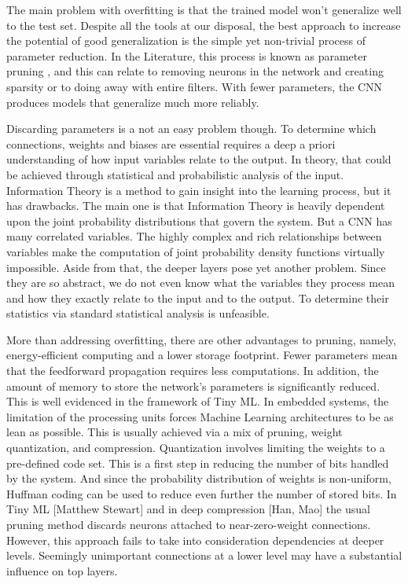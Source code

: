 \documentclass[12pt, a4paper]{article}
\begin{document}
The main problem with overfitting is that the trained model won’t generalize well to the test set. Despite all the tools at our disposal, the best approach to increase the potential of good generalization is the simple yet non-trivial process of parameter reduction. In the Literature, this process is known as parameter pruning \cite{li_pruning_2016,blalock_what_2020}, and this can relate to removing neurons in the network and creating sparsity or to doing away with entire filters. With fewer parameters, the CNN produces models that generalize much more reliably. 

Discarding parameters is a not an easy problem though. To determine which connections, weights and biases are essential requires a deep a priori understanding of how input variables relate to the output. In theory, that could be achieved through statistical and probabilistic analysis of the input. Information Theory is a method to gain insight into the learning process, but it has drawbacks. The main one is that Information Theory is heavily dependent upon the joint probability distributions that govern the system. But a CNN has many correlated variables. The highly complex and rich relationships between variables make the computation of joint probability density functions virtually impossible. Aside from that, the deeper layers pose yet another problem. Since they are so abstract, we do not even know what the variables they process mean and how they exactly relate to the input and to the output. To determine their statistics via standard statistical analysis is unfeasible. 

More than addressing overfitting, there are other advantages to pruning, namely, energy-efficient computing and a lower storage footprint. Fewer parameters mean that the feedforward propagation requires less computations. In addition, the amount of memory to store the network’s parameters is significantly reduced. This is  well evidenced in the framework of Tiny ML. In embedded systems, the limitation of the processing units forces Machine Learning architectures to be as lean as possible. This is usually achieved via a mix of pruning, weight quantization, and compression. Quantization involves limiting the weights to a pre-defined code set. This is a first step in reducing the number of bits handled by the system. And since the probability distribution of weights is non-uniform, Huffman coding can be used to reduce even further the number of stored bits. In Tiny ML [Matthew Stewart] and in deep compression [Han, Mao] the usual pruning method discards neurons attached to near-zero-weight connections. However, this approach fails to take into consideration dependencies at deeper levels. Seemingly unimportant connections at a lower level may have a substantial influence on top layers.  
\end{document}
